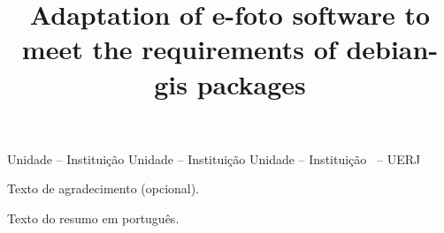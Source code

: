 \documentclass[a4paper,12pt,oneside,onecolumn,final,fleqn]{repUERJ}
\title{Adaptation of e-foto software to meet the requirements of debian-gis packages}
\begin{document}
	
	\frontmatter %
	
	\capa
	\folhaderosto
	\fichacatalografica{}
	\begin{folhadeaprovacao}
		{Unidade -- Instituição}
		{Unidade -- Instituição}
		{Unidade -- Instituição}
		{\UERJunidade \UERJunidadenome\ -- UERJ}
	\end{folhadeaprovacao}
	
	Texto de agradecimento (opcional).
	\pretextualchapter{}
	\vfill
	
	Texto do resumo em português.
	~\\
	
	\imprimirchaves %
	
\end{document}
